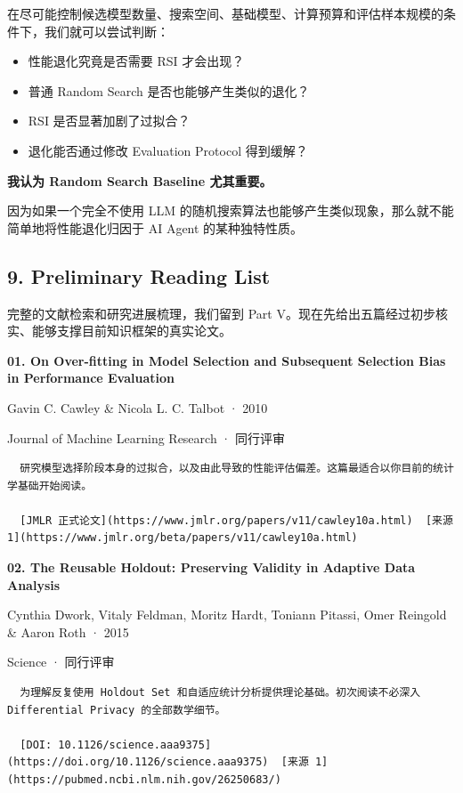 在尽可能控制候选模型数量、搜索空间、基础模型、计算预算和评估样本规模的条件下，我们就可以尝试判断：

\begin{itemize}
\tightlist
\item
  性能退化究竟是否需要 RSI 才会出现？
\item
  普通 Random Search 是否也能够产生类似的退化？
\item
  RSI 是否显著加剧了过拟合？
\item
  退化能否通过修改 Evaluation Protocol 得到缓解？
\end{itemize}

\textbf{我认为 Random Search Baseline 尤其重要。}

因为如果一个完全不使用 LLM 的随机搜索算法也能够产生类似现象，那么就不能简单地将性能退化归因于 AI Agent 的某种独特性质。

\hypertarget{part-1-03-0001-preliminary-reading-list}{%
\subsection{9. Preliminary Reading List}\label{part-1-03-0001-preliminary-reading-list}}

完整的文献检索和研究进展梳理，我们留到 Part V。现在先给出五篇经过初步核实、能够支撑目前知识框架的真实论文。

\textbf{01. On Over-fitting in Model Selection and Subsequent Selection Bias in Performance Evaluation}

Gavin C. Cawley \& Nicola L. C. Talbot · 2010

Journal of Machine Learning Research · 同行评审

\begin{verbatim}
  研究模型选择阶段本身的过拟合，以及由此导致的性能评估偏差。这篇最适合以你目前的统计学基础开始阅读。

  [JMLR 正式论文](https://www.jmlr.org/papers/v11/cawley10a.html)  [来源 1](https://www.jmlr.org/beta/papers/v11/cawley10a.html)
\end{verbatim}

\textbf{02. The Reusable Holdout: Preserving Validity in Adaptive Data Analysis}

Cynthia Dwork, Vitaly Feldman, Moritz Hardt, Toniann Pitassi, Omer Reingold \& Aaron Roth · 2015

Science · 同行评审

\begin{verbatim}
  为理解反复使用 Holdout Set 和自适应统计分析提供理论基础。初次阅读不必深入 Differential Privacy 的全部数学细节。

  [DOI: 10.1126/science.aaa9375](https://doi.org/10.1126/science.aaa9375)  [来源 1](https://pubmed.ncbi.nlm.nih.gov/26250683/)
\end{verbatim}

